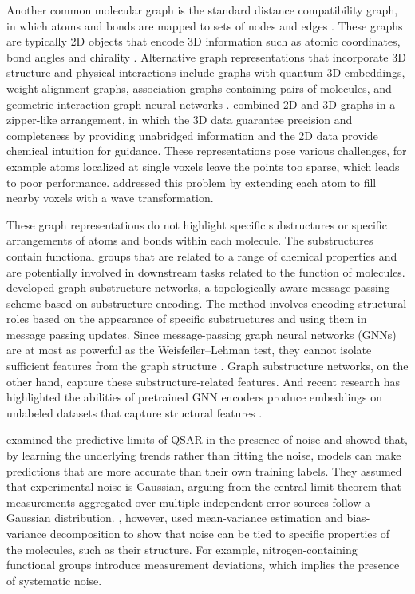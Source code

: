 Another common molecular graph is the standard distance compatibility graph, in which atoms and bonds are mapped to sets of nodes and edges \citep{David2020, Hnig2022}. These graphs are typically 2D objects that encode 3D information such as atomic coordinates, bond angles and chirality \citep{David2020}. Alternative graph representations that incorporate 3D structure and physical interactions include graphs with quantum 3D embeddings, weight alignment graphs, association graphs containing pairs of molecules, and geometric interaction graph neural networks \citep{Hnig2022, yan2023, Yang2023GIGN}. \citet{Du2022} combined 2D and 3D graphs in a zipper-like arrangement, in which the 3D data guarantee precision and completeness by providing unabridged information and the 2D data provide chemical intuition for guidance. These representations pose various challenges, for example atoms localized at single voxels leave the points too sparse, which leads to poor performance. \citet{Kuzminykh2018} addressed this problem by extending each atom to fill nearby voxels with a wave transformation.
      
These graph representations do not highlight specific substructures or specific arrangements of atoms and bonds within each molecule. The substructures contain functional groups that are related to a range of chemical properties and are potentially involved in downstream tasks related to the function of molecules. \citet{Bouritsas2023} developed graph substructure networks, a topologically aware message passing scheme based on substructure encoding. The method involves encoding structural roles based on the appearance of specific substructures and using them in message passing updates. Since message-passing graph neural networks (GNNs) are at most as powerful as the Weisfeiler--Lehman test, they cannot isolate sufficient features from the graph structure \citep{Bouritsas2023}. Graph substructure networks, on the other hand, capture these substructure-related features. And recent research has highlighted the abilities of pretrained GNN encoders produce embeddings on unlabeled datasets that capture structural features \citep{kishimoto2023, ross2022}. 

\citet{Kolmar2021} examined the predictive limits of QSAR in the presence of noise and showed that, by learning the underlying trends rather than fitting the noise, models can make predictions that are more accurate than their own training labels. They assumed that experimental noise is Gaussian, arguing from the central limit theorem that measurements aggregated over multiple independent error sources follow a Gaussian distribution. \citet{Heid2023}, however, used mean-variance estimation and bias-variance decomposition to show that noise can be tied to specific properties of the molecules, such as their structure. For example, nitrogen-containing functional groups introduce measurement deviations, which implies the presence of systematic noise.

